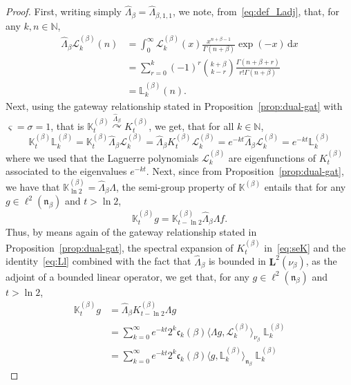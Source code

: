 \documentclass[AHL,Unicode,longabstracts]{cedram}
\newcommand{\NN}{\mathbb{N}}
\newcommand{\fn}{\mathfrak{n}}
\newcommand{\wit}{\widehat}
\newcommand{\dLs}{{\discret{K}}}
\newcommand{\Ls}{K}
\newcommand{\esL}{\mathbf{L}}
\newcommand{\esLd}{\ell}
\newcommand{\discret}[1]{\mathds{#1}}
\newcommand{\Ks}{\discret{K}}
\newcommand{\eigL}{\mathbb{L}_k}
\newcommand{\Gate}[3]{#1\stackrel{#2}{\curvearrowright}#3}
\newcommand*{\dd}{\mathrm{d}}
\newcommand*{\dx}{\dd x}
\begin{document}
\begin{proof}
First, writing simply $\wit \Lambda_{\beta}=\wit \Lambda_{\beta,1,1}$, we note, from~\eqref{eq:def_Ladj}, that, for any $k,n\in \NN$,
\begin{align}\label{eq:Ll}
\nonumber \wit \Lambda_{\beta}\mathcal{L}^{(\beta)}_k(n)&= \int_0^{\infty}\mathcal{L}^{(\beta)}_k(x)\frac{x^{n+\beta-1}}{\Gamma(n+\beta)}\exp(- x)\, \dx\\
&= \sum_{r=0}^k (-1)^r \binom{ k +\beta}{k-r} \frac{\Gamma(n+\beta+r)}{r! \Gamma(n+\beta)}\nonumber \\
&= \eigL^{(\beta)}(n).\phantom{\int^1}
\end{align}
Next, using the gateway relationship stated in Proposition~\ref{prop:dual-gat} with $\varsigma=\sigma=1$, that is $\Gate{\dLs_{t}^{(\beta)}}{\wit \Lambda_{\beta}}{\Ls_{t}^{(\beta)}}$, we get, that for all $k \in \mathbb{N}$,
\begin{equation*}\label{}
\Ks^{(\beta)}_t \eigL^{(\beta)} = \Ks^{(\beta)}_t \wit \Lambda_{\beta} \mathcal{L}^{(\beta)}_k= \wit \Lambda_{\beta} \Ls^{(\beta)}_t\mathcal{L}^{(\beta)}_k = e^{- k t } \wit \Lambda_{\beta} \mathcal{L}^{(\beta)}_k= e^{- k t } \eigL^{(\beta)}
\end{equation*}
where we used that the Laguerre polynomials $ \mathcal{L}^{(\beta)}_k$ are eigenfunctions of $\Ls^{(\beta)}_t$ associated to the eigenvalues $e^{-kt}$. Next, since from Proposition~\ref{prop:dual-gat}, we have that $\Ks^{(\beta)}_{\ln 2}=\wit \Lambda_{\beta} \Lambda$, the semi-group property of $\Ks^{(\beta)}$ entails that for any $ g \in \esLd^2(\fn_{\beta}) $ and $t>\ln 2$,
\[
\Ks^{(\beta)}_t g = \Ks^{(\beta)}_{t-\ln 2}\wit \Lambda_{\beta} \Lambda f.
\]
Thus, by means again of the gateway relationship stated in Proposition~\ref{prop:dual-gat}, the spectral expansion of $\Ls^{(\beta)}_t $ in~\eqref{eq:seK} and the identity~\eqref{eq:Ll} combined with the fact that $\wit \Lambda_{\beta}$ is bounded in $\esL^2(\nu_{\beta})$, as the adjoint of a bounded linear operator, we get that, for any $ g \in \esLd^2(\fn_{\beta}) $ and $t>\ln 2$,
\begin{align*}
\Ks^{(\beta)}_t g &= \wit \Lambda_{\beta} \Ls^{(\beta)}_{t-\ln 2} \Lambda g\phantom{\int_0} \\
&= \sum_{k=0}^{\infty}e^{-k t} 2^{k}\mathfrak{c}_{k}(\beta) \langle \Lambda g, \mathcal{L}^{(\beta)}_k \rangle_{\nu_{\beta}}\; \eigL^{(\beta)}\\
&= \sum_{k=0}^{\infty}e^{-k t} 2^{k}\mathfrak{c}_{k}(\beta) \langle g, \eigL^{(\beta)} \rangle_{\fn_{\beta}}\; \eigL^{(\beta)}

\end{align*}
\end{proof}
\end{document}
